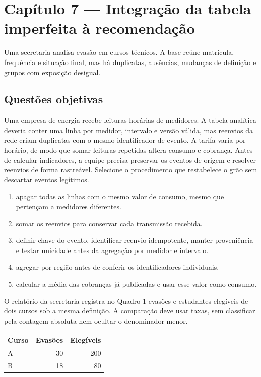 \section{Capítulo 7 --- Integração da tabela imperfeita à recomendação}

Uma secretaria analisa evasão em cursos técnicos. A base reúne matrícula, frequência e situação final, mas há duplicatas, ausências, mudanças de definição e grupos com exposição desigual.

\subsection{Questões objetivas}

\TextoBase Uma empresa de energia recebe leituras horárias de medidores. A tabela analítica deveria conter uma linha por medidor, intervalo e versão válida, mas reenvios da rede criam duplicatas com o mesmo identificador de evento. A tarifa varia por horário, de modo que somar leituras repetidas altera consumo e cobrança. Antes de calcular indicadores, a equipe precisa preservar os eventos de origem e resolver reenvios de forma rastreável.
\FonteDidatica
\Comando Selecione o procedimento que restabelece o grão sem descartar eventos legítimos.
\begin{enumerate}[label=\Alph*)]
\item apagar todas as linhas com o mesmo valor de consumo, mesmo que pertençam a medidores diferentes.
\item somar os reenvios para conservar cada transmissão recebida.
\item definir chave do evento, identificar reenvio idempotente, manter proveniência e testar unicidade antes da agregação por medidor e intervalo.
\item agregar por região antes de conferir os identificadores individuais.
\item calcular a média das cobranças já publicadas e usar esse valor como consumo.
\end{enumerate}

\TextoBase

O relatório da secretaria registra no Quadro 1 evasões e estudantes elegíveis de dois cursos sob a mesma definição. A comparação deve usar taxas, sem classificar pela contagem absoluta nem ocultar o denominador menor.
\begin{DocumentBox}
\begin{tabularx}{\textwidth}{@{}Yrr@{}}\toprule
\textbf{Curso} & \textbf{Evasões} & \textbf{Elegíveis}\\\midrule
A & 30 & 200\\ B & 18 & 80\\\bottomrule
\end{tabularx}
\end{DocumentBox}

